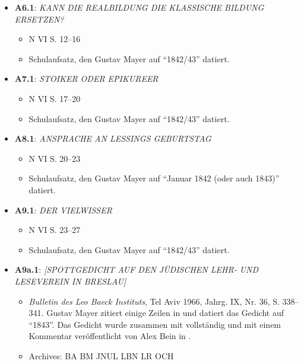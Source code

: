 \begin{itemize}
    \item \textbf{A6.1}: \textit{KANN DIE REALBILDUNG DIE KLASSISCHE BILDUNG ERSETZEN?}
    \begin{itemize}
        \item N VI S. 12--16
        \item Schulaufsatz, den Gustav Mayer auf ``1842/43'' datiert.
    \end{itemize}
    
    \item \textbf{A7.1}: \textit{STOIKER ODER EPIKUREER}
    \begin{itemize}
        \item N VI S. 17--20
        \item Schulaufsatz, den Gustav Mayer auf ``1842/43'' datiert.
    \end{itemize}
    
    \item \textbf{A8.1}: \textit{ANSPRACHE AN LESSINGS GEBURTSTAG}
    \begin{itemize}
        \item N VI S. 20--23
        \item Schulaufsatz, den Gustav Mayer auf ``Januar 1842 (oder auch 1843)'' datiert.
    \end{itemize}
    
    \item \textbf{A9.1}: \textit{DER VIELWISSER}
    \begin{itemize}
        \item N VI S. 23--27
        \item Schulaufsatz, den Gustav Mayer auf ``1842/43'' datiert.
    \end{itemize}
    
    \item \textbf{A9a.1}: \textit{[SPOTTGEDICHT AUF DEN JÜDISCHEN LEHR- UND LESEVEREIN IN BRESLAU]}
    \begin{itemize}
        \item \textit{Bulletin des Leo Baeck Instituts}, Tel Aviv 1966, Jahrg. IX, Nr. 36, S. 338--341. Gustav Mayer zitiert einige Zeilen in  und datiert das Gedicht auf ``1843''. Das Gedicht wurde zusammen mit  vollständig und mit einem Kommentar veröffentlicht von Alex Bein in .
        \item Archives: BA BM JNUL LBN LR OCH
    \end{itemize}
    

\end{itemize}
